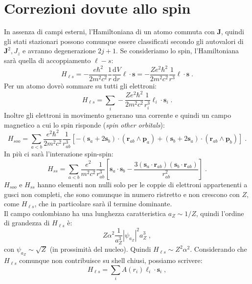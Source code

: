 \documentclass[12pt,a4paper]{report}
\theoremstyle{definition}
\newcommand{\dev}[3][]{\frac{\mathrm{d}^{#1} #2}{\mathrm{d} #3^{#1}}}
\numberwithin{equation}{section}
\begin{document}
\section{Correzioni dovute allo spin}
In assenza di campi esterni, l'Hamiltoniana di un atomo commuta con $\mathbf{J}$, quindi gli stati stazionari possono comunque essere classificati secondo gli autovalori di $\mathbf{J}^2,J_z$ e avranno degenerazione $2j+1$. Se consideriamo lo spin, l'Hamiltoniana sarà quella di accoppiamento $\ell-s$:
\begin{equation}
H_{\ell s}=-\frac{e\hbar^2}{2m^2c^2}\frac{1}{r}\dev{V}{r}\boldsymbol{\ell}\cdot\mathbf{s}=-\frac{Ze^2\hbar^2}{2m^2c^2}\frac{1}{r^3}\boldsymbol{\ell}\cdot\mathbf{s}\;.
\end{equation}
Per un atomo dovrò sommare su tutti gli elettroni:
\begin{equation}
H_{\ell s}=\sum_i -\frac{Ze^2\hbar^2}{2m^2c^2}\frac{1}{r_i^3}\boldsymbol{\ell}_i\cdot\mathbf{s}_i\;.
\end{equation}
Inoltre gli elettroni in movimento generano una corrente e quindi un campo magnetico a cui lo spin risponde (\emph{spin other orbitals}):
\begin{equation}
H_{soo}=\sum_{a<b}\frac{e^2\hbar^2}{2m^2c^2}\frac{1}{r_{ab}^3}\left[-(\mathbf{s}_a+2\mathbf{s}_b)\cdot(\mathbf{r}_{ab}\wedge\mathbf{p}_a)+(\mathbf{s}_b+2\mathbf{s}_a)\cdot(\mathbf{r}_{ab}\wedge\mathbf{p}_b)\right]\;.
\end{equation}
In più ci sarà l'interazione spin-spin:
\begin{equation}
H_{ss}=\sum_{a<b}\frac{e^2}{m^2c^2}\frac{1}{r_{ab}^3}\left[\mathbf{s}_a\cdot\mathbf{s}_b-\frac{3(\mathbf{s}_a\cdot\mathbf{r}_{ab})(\mathbf{s}_b\cdot\mathbf{r}_{ab})}{r^2_{ab}}\right]\;.
\end{equation}
$H_{soo}$ e $H_{ss}$ hanno elementi non nulli solo per le coppie di elettroni appartenenti a gusci non completi, che sono comunque in numero ristretto e non crescono con $Z$, come $H_{\ell s}$, che in particolare sarà il termine dominante. \\
Il campo coulombiano ha una lunghezza caratteristica $a_Z\sim 1/Z$, quindi l'ordine di grandezza di $H_{\ell s}$ è:
$$
Z\alpha^2\frac{1}{a_Z^3}|\psi_{a_Z}|^2 a_Z^3\;,
$$
con $\psi_{a_Z}\sim \sqrt{Z}$ (in prossimità del nucleo). Quindi $H_{\ell s}\sim Z^2\alpha^2$. Considerando che $H_{\ell s}$ comunque non contribuisce su shell chiusi, possiamo scrivere:
\begin{equation}
H_{\ell s}=\sum_i A(r_i)\boldsymbol{\ell}_i\cdot\mathbf{s}_i\;,
\end{equation}
\end{document}
